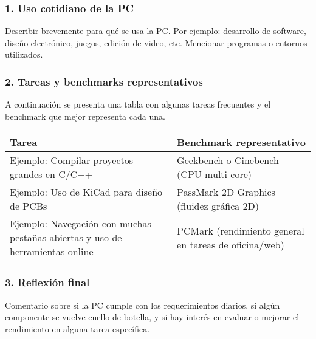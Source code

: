 
\subsubsection*{1. Uso cotidiano de la PC}
Describir brevemente para qué se usa la PC. Por ejemplo: desarrollo de software, diseño electrónico, juegos, edición de video, etc. Mencionar programas o entornos utilizados.

\subsubsection*{2. Tareas y benchmarks representativos}

A continuación se presenta una tabla con algunas tareas frecuentes y el benchmark que mejor representa cada una.

\begin{center}
\begin{tabular}{|p{7cm}|p{7cm}|}
\hline
\textbf{Tarea} & \textbf{Benchmark representativo} \\
\hline
Ejemplo: Compilar proyectos grandes en C/C++ & Geekbench o Cinebench (CPU multi-core) \\
\hline
Ejemplo: Uso de KiCad para diseño de PCBs & PassMark 2D Graphics (fluidez gráfica 2D) \\
\hline
Ejemplo: Navegación con muchas pestañas abiertas y uso de herramientas online & PCMark (rendimiento general en tareas de oficina/web) \\
\hline
\end{tabular}
\end{center}

\subsubsection*{3. Reflexión final}
Comentario sobre si la PC cumple con los requerimientos diarios, si algún componente se vuelve cuello de botella, y si hay interés en evaluar o mejorar el rendimiento en alguna tarea específica.
